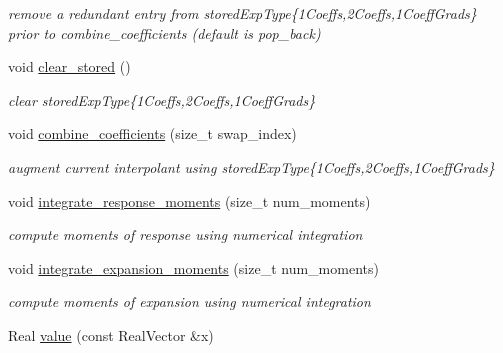 \begin{DoxyCompactItemize}
\begin{DoxyCompactList}\small\item\em remove a redundant entry from stored\+Exp\+Type\{1\+Coeffs,2\+Coeffs,1\+Coeff\+Grads\} prior to combine\+\_\+coefficients (default is pop\+\_\+back) \end{DoxyCompactList}\item 
void \hyperlink{classPecos_1_1HierarchInterpPolyApproximation_ae4337960917eda26a5672e5c6afbb62a}{clear\+\_\+stored} ()\label{classPecos_1_1HierarchInterpPolyApproximation_ae4337960917eda26a5672e5c6afbb62a}

\begin{DoxyCompactList}\small\item\em clear stored\+Exp\+Type\{1\+Coeffs,2\+Coeffs,1\+Coeff\+Grads\} \end{DoxyCompactList}\item 
void \hyperlink{classPecos_1_1HierarchInterpPolyApproximation_a7c794213befc83c9f90137f22e4cd39d}{combine\+\_\+coefficients} (size\+\_\+t swap\+\_\+index)\label{classPecos_1_1HierarchInterpPolyApproximation_a7c794213befc83c9f90137f22e4cd39d}

\begin{DoxyCompactList}\small\item\em augment current interpolant using stored\+Exp\+Type\{1\+Coeffs,2\+Coeffs,1\+Coeff\+Grads\} \end{DoxyCompactList}\item 
void \hyperlink{classPecos_1_1HierarchInterpPolyApproximation_a9e2f6de3dafca8df624fef2a132b5185}{integrate\+\_\+response\+\_\+moments} (size\+\_\+t num\+\_\+moments)\label{classPecos_1_1HierarchInterpPolyApproximation_a9e2f6de3dafca8df624fef2a132b5185}

\begin{DoxyCompactList}\small\item\em compute moments of response using numerical integration \end{DoxyCompactList}\item 
void \hyperlink{classPecos_1_1HierarchInterpPolyApproximation_a611ac6de1665bc1197922b77823250c2}{integrate\+\_\+expansion\+\_\+moments} (size\+\_\+t num\+\_\+moments)\label{classPecos_1_1HierarchInterpPolyApproximation_a611ac6de1665bc1197922b77823250c2}

\begin{DoxyCompactList}\small\item\em compute moments of expansion using numerical integration \end{DoxyCompactList}\item 
Real \hyperlink{classPecos_1_1HierarchInterpPolyApproximation_a7bc9dcdf32fc46f97e286268c1ac51b0}{value} (const Real\+Vector \&x)\label{classPecos_1_1HierarchInterpPolyApproximation_a7bc9dcdf32fc46f97e286268c1ac51b0}


\end{DoxyCompactItemize}
